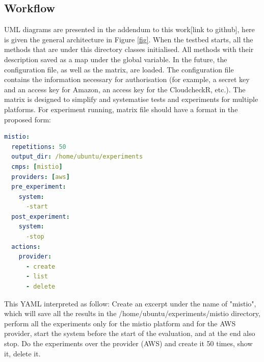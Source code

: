 \subsection{Workflow}
UML diagrams are presented in the addendum to this work[link to github], here is given the general architecture in Figure \ref{fig}. When the testbed starts, all the methods that are under this directory classes initialised. All methods with their description saved as a map under the global variable. In the future, the configuration file, as well as the matrix, are loaded. The configuration file contains the information necessary for authorisation (for example, a secret key and an access key for Amazon, an access key for the CloudcheckR, etc.). The matrix is designed to simplify and systematise tests and experiments for multiple platforms. For experiment running, matrix file should have a format in the proposed form:
\begin{lstlisting}[language=yaml]
mistio:
  repetitions: 50
  output_dir: /home/ubuntu/experiments
  cmps: [mistio]
  providers: [aws]
  pre_experiment:
    system:
      -start
  post_experiment:
    system:
      -stop
  actions:
    provider:
      - create
      - list
      - delete
\end{lstlisting}
This YAML interpreted as follow: Create an excerpt under the name of "mistio", which will save all the results in the /home/ubuntu/experiments/mistio directory, perform all the experiments only for the mistio platform and for the AWS provider, start the system before the start of the evaluation, and at the end also stop. Do the experiments over the provider (AWS) and create it 50 times, show it, delete it.
